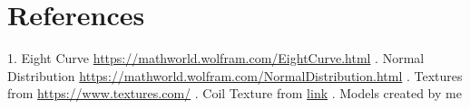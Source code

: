 \documentclass[10pt, oneside]{article}   	%
\begin{document}
\section{References}
1. Eight Curve \textcolor{blue}{\url{https://mathworld.wolfram.com/EightCurve.html}} . Normal Distribution \textcolor{blue}{\url{https://mathworld.wolfram.com/NormalDistribution.html}}
. Textures from \textcolor{blue}{\url{https://www.textures.com/}}  %
. Coil Texture from \textcolor{blue}{\href{http://polymericinsulators.m.sell.fnxradio.com/pz6904fc0-film-sintering-enamel-coated-copper-wire-for-motor-winding-high-power.html}{link}}
. Models created by me
\end{document}
